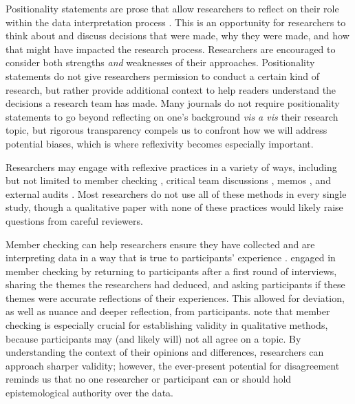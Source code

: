 \documentclass[authordate, meta]{jote-new-article}
\begin{document}
Positionality statements are prose that allow researchers to reflect on their role within the data interpretation process \parencites{Clancy2013}{Guillemin2004}{Lazard2020}{Makel2022}{Patton2014}{Rooney2015}{Savin-Baden2013}. This is an opportunity for researchers to think about and discuss decisions that were made, why they were made, and how that might have impacted the research process. Researchers are encouraged to consider both strengths \emph{and }weaknesses of their approaches. Positionality statements do not give researchers permission to conduct a certain kind of research, but rather provide additional context to help readers understand the decisions a research team has made. Many journals do not require positionality statements to go beyond reflecting on one’s background \emph{vis a vis} their research topic, but rigorous transparency compels us to confront how we will address\emph{ }potential biases, which is where reflexivity becomes especially important.



Researchers may engage with reflexive practices in a variety of ways, including but not limited to member checking \parencites{Caretta2016}{Creswell2000}{Goldblatt2016}{Lincoln1986}{Stake1995}, critical team discussions \textcites{Mao2016}, memos \parencites{Birks2008}, and external audits \parencites{Wolf2003}. Most researchers do not use all of these methods in every single study, though a qualitative paper with none of these practices would likely raise questions from careful reviewers.



Member checking can help researchers ensure they have collected and are interpreting data in a way that is true to participants’ experience \parencites[e.g.,][]{Caretta2016}. \textcites{Bornstein2022} engaged in member checking by returning to participants after a first round of interviews, sharing the themes the researchers had deduced, and asking participants if these themes were accurate reflections of their experiences. This allowed for deviation, as well as nuance and deeper reflection, from participants. \textcite{Caretta2019} note that member checking is especially crucial for establishing validity in qualitative methods, because participants may (and likely will) not all agree on a topic. By understanding the context of their opinions and differences, researchers can approach sharper validity; however, the ever-present potential for disagreement reminds us that no one researcher or participant can or should hold epistemological authority over the data.
\end{document}
